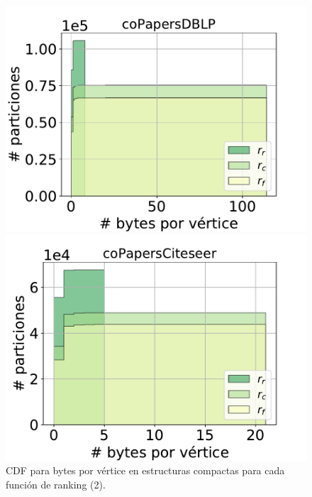 \begin{frame}
\begin{figure}
    	\begin{minipage}{1\textwidth}
    		\centering
    		\begin{minipage}{0.45\textwidth}
    			\centering
    			\includegraphics[width=1\linewidth]{../img/cdf/coPapersDBLP.pdf}
    		\end{minipage}
    		\begin{minipage}{0.45\textwidth}
    			\centering
    			\includegraphics[width=1\linewidth]{../img/cdf/coPapersCiteseer.pdf}
    		\end{minipage}  
    	\end{minipage}	

    \caption{CDF para bytes por vértice en estructuras compactas para cada función de ranking (2).}
\end{figure}

\end{frame}




